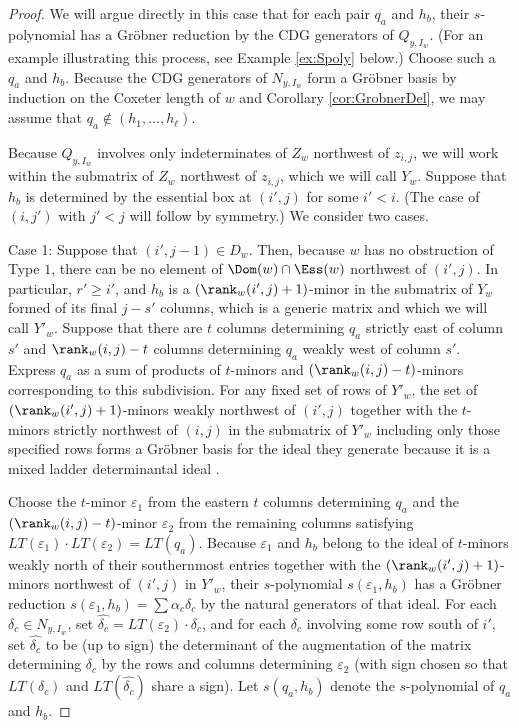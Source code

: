 \begin{proof}
We will argue directly in this case that for each pair $q_a$ and $h_b$, their $s$-polynomial has a Gr\"obner reduction by the CDG generators of $Q_{y,I_w}$.  (For an example illustrating this process, see Example \ref{ex:Spoly} below.)  Choose such a $q_a$ and $h_b$.  Because the CDG generators of $N_{y,I_w}$ form a Gr\"obner basis by induction on the Coxeter length of $w$ and Corollary \ref{cor:GrobnerDel}, we may assume that $q_a \notin (h_1, \ldots, h_\ell)$.  

Because $Q_{y,I_w}$ involves only indeterminates of $Z_w$ northwest of $z_{i,j}$, we will work within the submatrix of $Z_w$ northwest of $z_{i,j}$, which we will call $Y_w$.  Suppose that $h_b$ is determined by the essential box at $(i',j)$ for some $i'<i$.  (The case of $(i,j')$ with $j'<j$ will follow by symmetry.)  We consider two cases.  

Case 1: Suppose that $(i',j-1) \in D_w$.  Then, because $w$ has no obstruction of Type $1$, there can be no element of $\Dom(w) \cap \Ess(w)$ northwest of $(i',j)$.  In particular, $r' \geq i'$, and $h_b$ is a $(\rank_w(i',j)+1)$-minor in the submatrix of $Y_w$ formed of its final $j-s'$ columns, which is a generic matrix and which we will call $Y'_w$.  Suppose that there are $t$ columns determining $q_a$ strictly east of column $s'$ and $\rank_w(i,j)-t$ columns determining $q_a$ weakly west of column $s'$.  Express $q_a$ as a sum of products of $t$-minors and $(\rank_w(i,j)-t)$-minors corresponding to this subdivision.  For any fixed set of rows of $Y'_w$, the set of $(\rank_w(i',j)+1)$-minors weakly northwest of $(i',j)$ together with the $t$-minors strictly northwest of $(i,j)$ in the submatrix of $Y'_w$ including only those specified rows forms a Gr\"obner basis for the ideal they generate because it is a mixed ladder determinantal ideal \cite[Theorem 1.10]{Gor07}.  

Choose the $t$-minor $\varepsilon_1$ from the eastern $t$ columns determining $q_a$ and the $(\rank_w(i,j)-t)$-minor $\varepsilon_2$ from the remaining columns satisfying $LT(\varepsilon_1) \cdot LT(\varepsilon_2) = LT(q_a)$.  Because $\varepsilon_1$ and $h_b$ belong to the ideal of $t$-minors weakly north of their southernmost entries together with the $(\rank_w(i',j)+1)$-minors northwest of $(i',j)$ in $Y'_w$, their $s$-polynomial $s(\varepsilon_1,h_b)$ has a Gr\"obner reduction $s(\varepsilon_1,h_b) = \sum \alpha_c \delta_c $ by the natural generators of that ideal.  For each $\delta_c \in N_{y,I_w}$, set $\widehat{\delta_c} = LT(\varepsilon_2) \cdot \delta_c$, and for each $\delta_c$ involving some row south of $i'$, set $\widehat{\delta_c}$ to be (up to sign) the determinant of the augmentation of the matrix determining $\delta_c$ by the rows and columns determining $\varepsilon_2$ (with sign chosen so that $LT(\delta_c)$ and $LT(\widehat{\delta_c})$ share a sign).  Let $s(q_a,h_b)$ denote the $s$-polynomial of $q_a$ and $h_b$.  


\end{proof}
